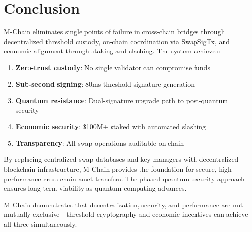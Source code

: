 \documentclass[11pt]{article}
\begin{document}
\section{Conclusion}

M-Chain eliminates single points of failure in cross-chain bridges through decentralized threshold custody, on-chain coordination via SwapSigTx, and economic alignment through staking and slashing. The system achieves:

\begin{enumerate}
\item \textbf{Zero-trust custody}: No single validator can compromise funds
\item \textbf{Sub-second signing}: 80ms threshold signature generation
\item \textbf{Quantum resistance}: Dual-signature upgrade path to post-quantum security
\item \textbf{Economic security}: \$100M+ staked with automated slashing
\item \textbf{Transparency}: All swap operations auditable on-chain
\end{enumerate}

By replacing centralized swap databases and key managers with decentralized blockchain infrastructure, M-Chain provides the foundation for secure, high-performance cross-chain asset transfers. The phased quantum security approach ensures long-term viability as quantum computing advances.

M-Chain demonstrates that decentralization, security, and performance are not mutually exclusive—threshold cryptography and economic incentives can achieve all three simultaneously.
\end{document}
